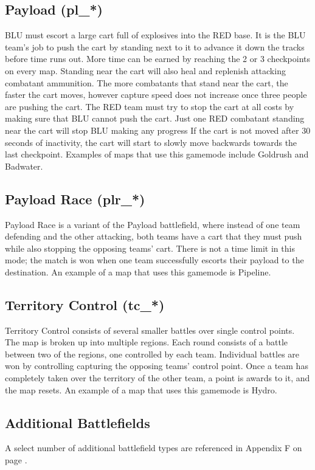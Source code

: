 \subsection{Payload (pl\_*)}
BLU must escort a large cart full of explosives into the RED base. It is the BLU team's job to push the cart by standing next to it to advance it down the tracks before time runs out. More time can be earned by reaching the 2 or 3 checkpoints on every map. Standing near the cart will also heal and replenish attacking combatant ammunition. The more combatants that stand near the cart, the faster the cart moves, however capture speed does not increase once three people are pushing the cart. The RED team must try to stop the cart at all costs by making sure that BLU cannot push the cart. Just one RED combatant standing near the cart will stop BLU making any progress If the cart is not moved after 30 seconds of inactivity, the cart will start to slowly move backwards towards the last checkpoint. Examples of maps that use this gamemode include Goldrush and Badwater.

\subsection{Payload Race (plr\_*)}
Payload Race is a variant of the Payload battlefield, where instead of one team defending and the other attacking, both teams have a cart that they must push while also stopping the opposing teams’ cart. There is not a time limit in this mode; the match is won when one team successfully escorts their payload to the destination. An example of a map that uses this gamemode is Pipeline.

\subsection{Territory Control (tc\_*)}
Territory Control consists of several smaller battles over single control points.  The map is broken up into multiple regions.  Each round consists of a battle between two of the regions, one controlled by each team. Individual battles are won by controlling capturing the opposing teams' control point.  Once a team has completely taken over the territory of the other team, a point is awards to it, and the map resets. An example of a map that uses this gamemode is Hydro.

\subsection{Additional Battlefields}
A select number of additional battlefield types are referenced in Appendix F on page \pageref{Additional_Battlefields}.